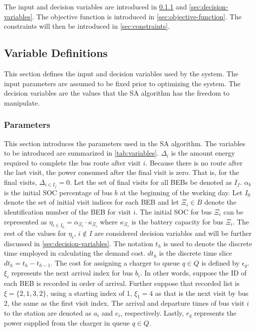\documentclass[11pt,a4paper,final]{article}
\newcommand{\Isetinit}{I_0}                 %
\newcommand{\Isetfinal}{I_f}                %
\begin{document}
The input and decision variables are introduced in \ref{sec:input-variables} and \ref{sec:decision-variables}. The
objective function is introduced in \ref{sec:objective-function}. The constraints will then be introduced in
\ref{sec:constraints}.

\subsection{Variable Definitions}
\label{sec:parameter-definitions}
This section defines the input and decision variables used by the system. The input parameters are assumed to be fixed
prior to optimizing the system. The decision variables are the values that the SA algorithm has the freedom to
manipulate.

\subsubsection{Parameters}
\label{sec:input-variables}
This section introduces the parameters used in the SA algorithm. The variables to be introduced are summarized in
\ref{tab:variables}. \(\Delta_i\) is the amount energy required to complete the bus route after visit \(i\). Because there is no route
after the last visit, the power consumed after the final visit is zero. That is, for the final visits, \(\Delta_{i \in
\Isetfinal} = 0\). Let the set of final visits for all BEBs be denoted as \(\Isetfinal\). \(\alpha_b\) is the initial SOC
percentage of bus \(b\) at the beginning of the working day. Let \(\Isetinit\) denote the set of initial visit indices for
each BEB and let \(\Xi_i \in B\) denote the identification number of the BEB for visit \(i\). The initial SOC for bus \(\Xi_i\) can
be represented as \(\eta_{i \in \Isetinit} = \alpha_{\Xi_i} \cdot \kappa_{\Xi_i}\) where \(\kappa_{\Xi_i}\) is the battery capacity for bus \(\Xi_i\). The
rest of the values for \(\eta_i\), \(i \not\in I\) are considered decision variables and will be further discussed in
\ref{sec:decision-variables}. The notation \(t_h\) is used to denote the discrete time employed in calculating the demand cost.
\(dt_h\) is the discrete time slice \(dt_h = t_h - t_{h-1}\). The cost for assigning a charger to queue \(q \in Q\) is defined
by \(\epsilon_q\). \(\xi_i\) represents the next arrival index for bus \(b_i\). In other words, suppose the ID of each BEB is recorded
in order of arrival. Further suppose that recorded list is \(\xi = \{ 2,1,3,2 \}\), using a starting index of 1, \(\xi_1 = 4\)
as that is the next visit by bus 2, the same as the first visit index. The arrival and departure times of bus visit \(i\)
to the station are denoted as \(a_i\) and \(e_i\), respectively. Lastly, \(r_q\) represents the power supplied from the
charger in queue \(q \in Q\).
\end{document}
